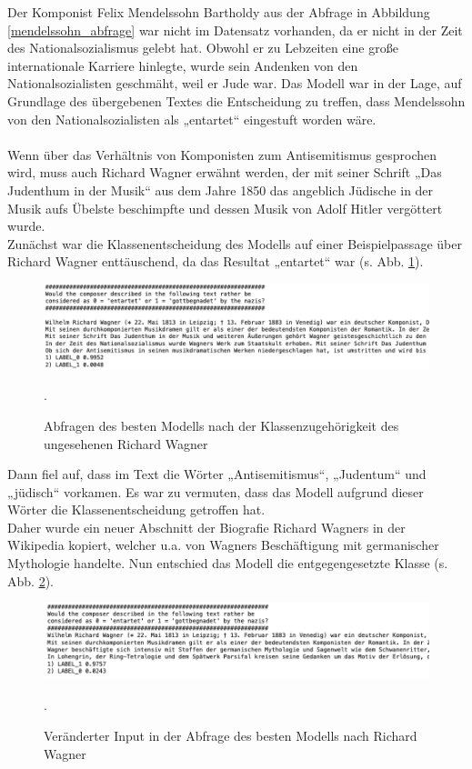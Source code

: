 \documentclass[ngerman]{ttlab-qualify}
\begin{document}
\noindent Der Komponist Felix Mendelssohn Bartholdy aus der Abfrage in Abbildung \ref{mendelssohn_abfrage} war nicht im Datensatz vorhanden, da er nicht in der Zeit des Nationalsozialismus gelebt hat. Obwohl er zu Lebzeiten eine große internationale Karriere hinlegte, wurde sein Andenken von den Nationalsozialisten geschmäht, weil er Jude war. Das Modell war in der Lage, auf Grundlage des übergebenen Textes die Entscheidung zu treffen, dass Mendelssohn von den Nationalsozialisten als „entartet“ eingestuft worden wäre.\\
\\
Wenn über das Verhältnis von Komponisten zum Antisemitismus gesprochen wird, muss auch Richard Wagner erwähnt werden, der mit seiner Schrift „Das Judenthum in der Musik“ aus dem Jahre 1850 das angeblich Jüdische in der Musik aufs Übelste beschimpfte und dessen Musik von Adolf Hitler vergöttert wurde.\\
Zunächst war die Klassenentscheidung des Modells auf einer Beispielpassage über Richard Wagner enttäuschend, da das Resultat „entartet“ war (s. Abb. \ref{wagner_abfrage}).
\begin{figure}[H]
\begin{center}
\includegraphics[width=16cm]{grafiken/Abfrage_Wagner.png}
\caption[Abfragen des besten Modells nach der Klassenzugehörigkeit des ungesehenen Richard Wagner]{Abfragen des besten Modells nach der Klassenzugehörigkeit des ungesehenen Richard Wagner}.
\label{wagner_abfrage}
\end{center}
\end{figure}
\noindent Dann fiel auf, dass im Text die Wörter „Antisemitismus“, „Judentum“ und „jüdisch“ vorkamen. Es war zu vermuten, dass das Modell aufgrund dieser Wörter die Klassenentscheidung getroffen hat.\\
Daher wurde ein neuer Abschnitt der Biografie Richard Wagners in der Wikipedia kopiert, welcher u.a. von Wagners Beschäftigung mit germanischer Mythologie handelte. Nun entschied das Modell die entgegengesetzte Klasse (s. Abb. \ref{wagner_abfrage2}).
\begin{figure}[H]
\begin{center}
\includegraphics[width=16cm]{grafiken/Abfrage_Wagner2.png}
\caption[Veränderter Input in der Abfrage des besten Modells nach Richard Wagner]{Veränderter Input in der Abfrage des besten Modells nach Richard Wagner}.
\label{wagner_abfrage2}
\end{center}
\end{figure}
\end{document}
